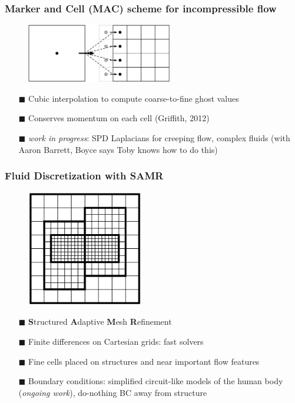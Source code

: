 \documentclass[8pt]{beamer}
\begin{document}
\begin{frame}
    \frametitle{Marker and Cell (MAC) scheme for incompressible flow}
    \begin{figure}
        \centering
        \includegraphics[width=2.5in]{cf_interface_6-1380.pdf}
    \end{figure}
    \begin{itemize}
        \item[$\blacksquare$] Cubic interpolation to compute coarse-to-fine
        ghost values
        \item[$\blacksquare$] Conserves momentum on each cell (Griffith, 2012)
        \item[$\blacksquare$] \emph{work in progress}: SPD Laplacians for
        creeping flow, complex fluids (with Aaron Barrett, Boyce says Toby knows
        how to do this)
    \end{itemize}
\end{frame}

\begin{frame}
    \frametitle{Fluid Discretization with SAMR}
    \begin{figure}
        \includegraphics[width=2in]{valid-grid-3-levels.pdf}
    \end{figure}
    \begin{itemize}
        \item[$\blacksquare$] \textbf{S}tructured \textbf{A}daptive \textbf{M}esh \textbf{R}efinement
        \item[$\blacksquare$] Finite differences on Cartesian grids: fast solvers
        \item[$\blacksquare$] Fine cells placed on structures and near important
        flow features
        \item[$\blacksquare$] Boundary conditions: simplified circuit-like
        models of the human body (\emph{ongoing work}), do-nothing BC away from structure
    \end{itemize}
\end{frame}
\end{document}
